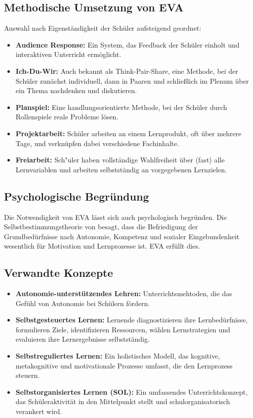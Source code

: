 \subsection{Methodische Umsetzung von EVA}
Auswahl nach Eigenst\"andigkeit der Sch\"uler aufsteigend geordnet:
\begin{itemize}
	\item \textbf{Audience Response:} Ein System, das Feedback der Sch\"uler einholt und interaktiven Unterricht erm\"oglicht.
	\item  \textbf{Ich-Du-Wir:} Auch bekannt als \glqq Think-Pair-Share\grqq, eine Methode, bei der Sch\"uler zunächst individuell, dann in Paaren und schlie\ss lich im Plenum über ein Thema nachdenken und diskutieren.
	\item \textbf{Planspiel:} Eine handlungsorientierte Methode, bei der Sch\"uler durch Rollenspiele reale Probleme l\"osen.
	\item \textbf{Projektarbeit:} Sch\"uler arbeiten an einem Lernprodukt, oft \"uber mehrere Tage, und verkn\"upfen dabei verschiedene Fachinhalte.
	\item \textbf{Freiarbeit:} Sch"uler haben vollst\"andige Wahlfreiheit \"uber (fast) alle Lernvariablen und arbeiten selbstst\"andig an vorgegebenen Lernzielen.
\end{itemize}

\subsection{Psychologische Begr\"undung}
Die Notwendigkeit von EVA l\"asst sich auch psychologisch begr\"unden. Die Selbstbestimmungstheorie von \textcite{DeciRyan} besagt, dass die Befriedigung der Grundbed\"urfnisse nach Autonomie, Kompetenz und sozialer Eingebundenheit wesentlich f\"ur Motivation und Lernprozesse ist. EVA erf\"ullt dies.

\subsection{Verwandte Konzepte}
\begin{itemize}
	\item \textbf{Autonomie-unterst\"utzendes Lehren:} Unterrichtsmehtoden, die das Gef\"uhl von Autonomie bei Sch\"ulern f\"ordern.
	\item \textbf{Selbstgesteuertes Lernen:} Lernende diagnostizieren ihre Lernbed\"urfnisse, formulieren Ziele, identifizieren Ressourcen, w\"ahlen Lernstrategien und evaluieren ihre Lernergebnisse selbstst\"andig.
	\item \textbf{Selbstreguliertes Lernen:} Ein holistisches Modell, das kognitive, metakognitive und motivationale Prozesse umfasst, die den Lernprozess steuern.
	\item \textbf{Selbstorganisiertes Lernen (SOL):} Ein umfassendes Unterrichtskonzept, das Sch\"uleraktivit\"at in den Mittelpunkt stellt und schulorganisatorisch verankert wird.
\end{itemize}

